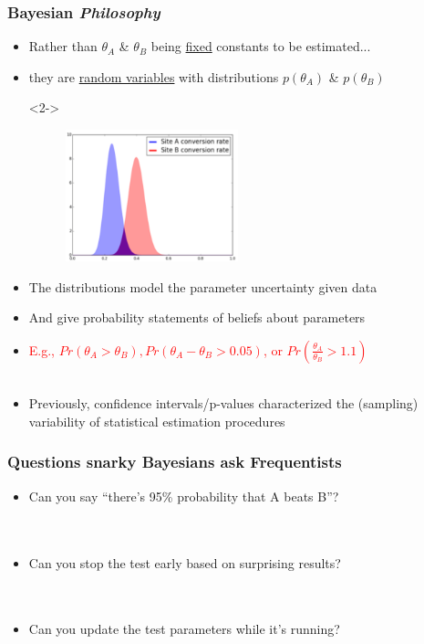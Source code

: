 \documentclass[xcolor={dvipsnames}]{beamer}
\begin{document}
\frame
{
\frametitle{Bayesian \emph{Philosophy}}

  \begin{itemize}
  \item<1-> Rather than $\theta_A$ \& $\theta_B$ being \underline{fixed} constants to be estimated...
  \item<2-> they are \underline{random variables} with distributions $p(\theta_A)$ \& $p(\theta_B)$ \\
  \item[]<2-> 

\begin{figure}
\centering
\includegraphics[height=1.5in]{stuff/priors.png}
\end{figure}

  \item<3->  The distributions model the parameter uncertainty given data
  \item<3->  And give probability statements of beliefs about parameters 
  \item<4->[]  \textcolor{red}{E.g., $Pr(\theta_A > \theta_B), Pr(\theta_A - \theta_B > 0.05)$, or $Pr(\frac{\theta_A}{\theta_B}>1.1)$}\\${}$
  \item<5-> Previously, confidence intervals/p-values characterized the (sampling) variability of statistical estimation procedures
  
   
\end{itemize}
}

\frame
{
\frametitle{Questions snarky Bayesians ask Frequentists}


\begin{itemize}
\item Can you say ``there's 95\% probability that A beats B''? \\\\${}$
\item<3-> Can you stop the test early based on surprising results? \\\\${}$
\item<5-> Can you update the test parameters while it's running? \\
\end{itemize}


}
\end{document}

